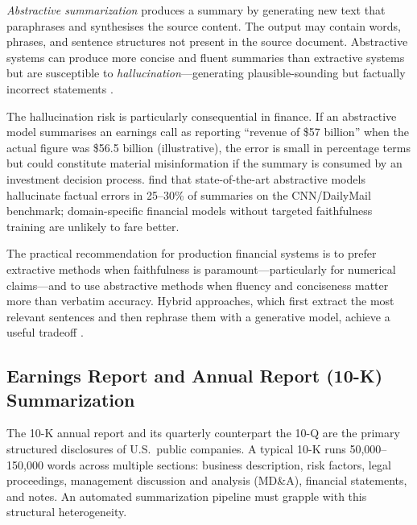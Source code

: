 \begin{definition}
\label{def:abstractive-summarization}
\emph{Abstractive summarization} produces a summary by generating new text that
paraphrases and synthesises the source content. The output may contain words, phrases,
and sentence structures not present in the source document. Abstractive systems can
produce more concise and fluent summaries than extractive systems but are susceptible
to \emph{hallucination}---generating plausible-sounding but factually incorrect statements
\citep{maynez2020faithfulness}.
\end{definition}

The hallucination risk is particularly consequential in finance. If an abstractive
model summarises an earnings call as reporting ``revenue of \$57 billion'' when the
actual figure was \$56.5 billion (illustrative), the error is small in percentage terms but could
constitute material misinformation if the summary is consumed by an investment decision
process. \citet{kryscinski2020evaluating} find that state-of-the-art abstractive models
hallucinate factual errors in 25--30\% of summaries on the CNN/DailyMail benchmark;
domain-specific financial models without targeted faithfulness training are unlikely to
fare better.

The practical recommendation for production financial systems is to prefer extractive
methods when faithfulness is paramount---particularly for numerical claims---and to use
abstractive methods when fluency and conciseness matter more than verbatim accuracy.
Hybrid approaches, which first extract the most relevant sentences and then rephrase
them with a generative model, achieve a useful tradeoff \citep{see2017get}.

\subsection{Earnings Report and Annual Report (10-K) Summarization}
\label{sec:ch14-earnings-annual-report-summarization}

The 10-K annual report and its quarterly counterpart the 10-Q are the primary structured
disclosures of U.S.\ public companies. A typical 10-K runs 50,000--150,000 words across
multiple sections: business description, risk factors, legal proceedings, management
discussion and analysis (MD\&A), financial statements, and notes. An automated
summarization pipeline must grapple with this structural heterogeneity.

